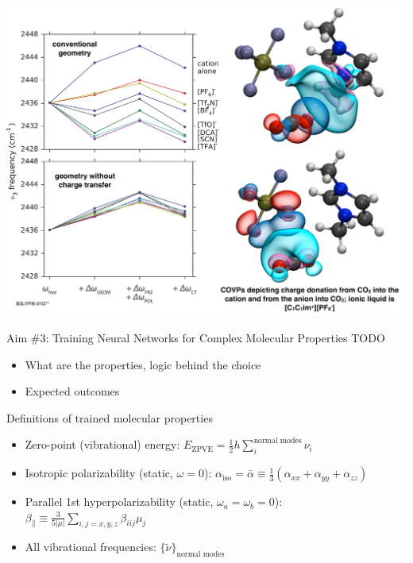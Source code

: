 \documentclass[xetex,compress]{beamer}
\begin{document}
\begin{frame}{}
  \begin{center}
    \includegraphics[scale=0.30]{./figures/slide_ionic_liquid.pdf}
  \end{center}
\end{frame}


\begin{frame}{Aim \#3: Training Neural Networks for Complex Molecular Properties}
  TODO
  \begin{itemize}
  \item What are the properties, logic behind the choice
  \item Expected outcomes
  \end{itemize}
\end{frame}

\begin{frame}{Definitions of trained molecular properties}
  \begin{itemize}
  \item Zero-point (vibrational) energy: \(E_{\text{ZPVE}} = \frac{1}{2} h \sum_{i}^{\text{normal modes}} \nu_{i}\)
  \item Isotropic polarizability (static, \(\omega = 0\)): \(\alpha_{\text{iso}} = \bar{\alpha} \equiv \frac{1}{3} (\alpha_{xx} + \alpha_{yy} + \alpha_{zz})\)
  \item Parallel 1st hyperpolarizability (static, \(\omega_{a} = \omega_{b} = 0\)): \(\beta_{\parallel} \equiv \frac{3}{5|\mu|} \sum_{i,j=x,y,z} \beta_{iij} \mu_{j}\)
  \item All vibrational frequencies: \(\{\tilde{\nu}\}_{\text{normal modes}}\)
  \end{itemize}
\end{frame}
\end{document}
